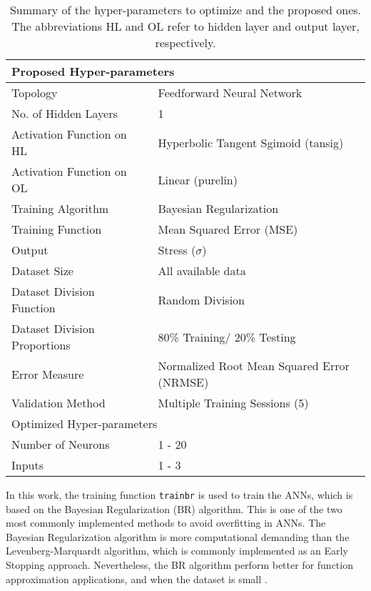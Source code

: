 \begin{table}[!htbp]
    \centering
    \caption{Summary of the hyper-parameters to optimize and the proposed ones. The abbreviations HL and OL refer to hidden layer and output layer, respectively.}
    \begin{tabular}{l m{1cm} l}
    \toprule
    \multicolumn{3}{l}{Proposed Hyper-parameters} \\
    \hline
    Topology                        & & Feedforward Neural Network \\
    No. of Hidden Layers            & & 1 \\
    Activation Function on HL       & & Hyperbolic Tangent Sgimoid (tansig)\\
    Activation Function on OL       & & Linear (purelin)\\
    Training Algorithm              & & Bayesian Regularization\\
    Training Function               & & Mean Squared Error (MSE)\\
    Output                          & & Stress ($\sigma$)\\
    Dataset Size                    & & All available data\\
    Dataset Division Function       & & Random Division  \\
    Dataset Division Proportions    & & 80\% Training/ 20\% Testing\\
    Error Measure                   & & Normalized Root Mean Squared Error (NRMSE)\\
    Validation Method               & & Multiple Training Sessions (5)\\
    \midrule
    \multicolumn{3}{l}{Optimized Hyper-parameters}\\
    \hline
    Number of Neurons           & & 1 - 20 \\
    Inputs                      & & 1 - 3 \\
    \bottomrule
    \end{tabular}
    \label{tbl:ANN_parameters}
\end{table}

In this work, the training function \texttt{trainbr} is used to train the ANNs, which is based on the Bayesian Regularization (BR) algorithm. This is one of the two most commonly implemented methods to avoid overfitting in ANNs. The Bayesian Regularization algorithm is more computational demanding than the Levenberg-Marquardt algorithm, which is commonly implemented as an Early Stopping approach. Nevertheless, the BR algorithm perform better for function approximation applications, and when the dataset is small \cite{matlab2019improve}.

